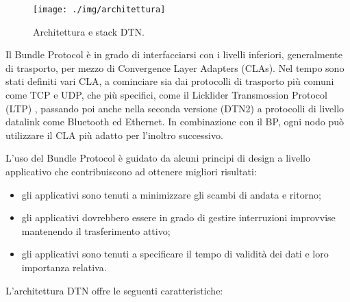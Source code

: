 \documentclass[12pt,a4paper,oneside]{book}
\begin{document}
		\begin{figure}[h]
			\centering
			\texttt{[image: ./img/architettura]}
			\caption{Architettura e stack DTN.}
			\label{fig:architettura}
		\end{figure}
				
		Il Bundle Protocol è in grado di interfacciarsi con i livelli inferiori, generalmente di trasporto, per mezzo di Convergence Layer Adapters (CLAs). Nel tempo sono stati definiti vari CLA, a cominciare sia dai protocolli di trasporto più comuni come TCP\cite{demmer2014delay} e UDP\cite{kruse2008udp}, che più specifici, come il Licklider Transmossion Protocol (LTP) \cite{ramadas2008rfc}\cite{burleigh2013delay}, passando poi anche nella seconda versione\cite{delay2012dtn2} (DTN2) a protocolli di livello datalink come Bluetooth ed Ethernet. 
		In combinazione con il BP, ogni nodo può utilizzare il CLA più adatto per l'inoltro successivo. 
		
		L'uso del Bundle Protocol è guidato da alcuni principi di design a livello applicativo che contribuiscono ad ottenere migliori risultati:
		\begin{itemize}
			\item gli applicativi sono tenuti a minimizzare gli scambi di andata e ritorno;
			\item gli applicativi dovrebbero essere in grado di gestire interruzioni improvvise mantenendo il trasferimento attivo;
			\item gli applicativi sono tenuti a specificare il tempo di validità dei dati e loro importanza relativa.
		\end{itemize}	
		L'architettura DTN offre le seguenti caratteristiche:
		
\end{document}
